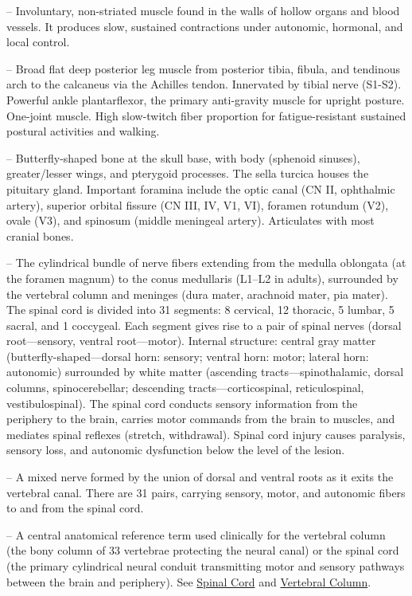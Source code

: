 -- Involuntary, non-striated muscle found in the walls of hollow organs and blood vessels. It produces slow, sustained contractions under autonomic, hormonal, and local control.

-- Broad flat deep posterior leg muscle from posterior tibia, fibula, and tendinous arch to the calcaneus via the Achilles tendon. Innervated by tibial nerve (S1-S2). Powerful ankle plantarflexor, the primary anti-gravity muscle for upright posture. One-joint muscle. High slow-twitch fiber proportion for fatigue-resistant sustained postural activities and walking.

-- Butterfly-shaped bone at the skull base, with body (sphenoid sinuses), greater/lesser wings, and pterygoid processes. The sella turcica houses the pituitary gland. Important foramina include the optic canal (CN II, ophthalmic artery), superior orbital fissure (CN III, IV, V1, VI), foramen rotundum (V2), ovale (V3), and spinosum (middle meningeal artery). Articulates with most cranial bones.

-- The cylindrical bundle of nerve fibers extending from the medulla oblongata (at the foramen magnum) to the conus medullaris (L1--L2 in adults), surrounded by the vertebral column and meninges (dura mater, arachnoid mater, pia mater). The spinal cord is divided into 31 segments: 8 cervical, 12 thoracic, 5 lumbar, 5 sacral, and 1 coccygeal. Each segment gives rise to a pair of spinal nerves (dorsal root—sensory, ventral root—motor). Internal structure: central gray matter (butterfly-shaped—dorsal horn: sensory; ventral horn: motor; lateral horn: autonomic) surrounded by white matter (ascending tracts—spinothalamic, dorsal columns, spinocerebellar; descending tracts—corticospinal, reticulospinal, vestibulospinal). The spinal cord conducts sensory information from the periphery to the brain, carries motor commands from the brain to muscles, and mediates spinal reflexes (stretch, withdrawal). Spinal cord injury causes paralysis, sensory loss, and autonomic dysfunction below the level of the lesion.

-- A mixed nerve formed by the union of dorsal and ventral roots as it exits the vertebral canal. There are 31 pairs, carrying sensory, motor, and autonomic fibers to and from the spinal cord.

-- A central anatomical reference term used clinically for the vertebral column (the bony column of 33 vertebrae protecting the neural canal) or the spinal cord (the primary cylindrical neural conduit transmitting motor and sensory pathways between the brain and periphery). See \hyperlink{Spinal Cord}{Spinal Cord} and \hyperlink{Vertebral Column}{Vertebral Column}.

